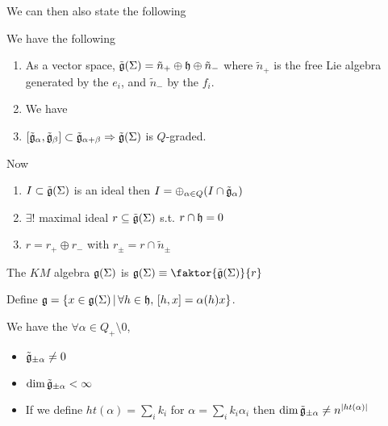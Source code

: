 \documentclass{article}
\begin{document}
We can then also state the following 

\begin{theorem}
We have the following 
\begin{enumerate}
    \item As a vector space, $\tilde{\mf{g}}(\Sigma) = \tilde{n}_+ \oplus \mf{h} \oplus \tilde{n}_-$ where $\tilde{n}_+ $ is the free Lie algebra generated by the $e_i$, and $\tilde{n}_-$ by the $f_i$. 
    \item We have 
\item $\comm[\tilde{\mf{g}}_\alpha]{\tilde{\mf{g}}_\beta}\subset \tilde{\mf{g}}_{\alpha +\beta} \Rightarrow \tilde{\mf{g}}(\Sigma)$ is $Q$-graded. 
\end{enumerate}
\end{theorem}

Now 
\begin{lemma}
\begin{enumerate}
    \item $I \subset \tilde{\mf{g}}(\Sigma)$ is an ideal then $I = \oplus_{\alpha \in Q} (I \cap \tilde{\mf{g}}_\alpha)$
    \item $\exists! $ maximal ideal $r \subseteq \tilde{\mf{g}}(\Sigma)$ s.t. $r \cap \mf{h}=0$ 
    \item $r = r_+ \oplus r_-$ with $r_\pm = r \cap \tilde{n}_\pm$
\end{enumerate}
\end{lemma}

\begin{definition}
The $KM$ algebra $\mf{g}(\Sigma)$ is $\mf{g}(\Sigma)\equiv \faktor{\tilde{\mf{g}}(\Sigma)}{r}$
\end{definition}

\begin{definition}
Define $\mf{g} = \pbrace{x \in \mf{g}(\Sigma) \, | \, \forall h \in \mf{h}, \, \comm[h]{x} = \alpha(h)x}$.
\end{definition}

\begin{remark}
We have the $\forall \alpha \in Q_+ \setminus 0$, 
\begin{itemize}
    \item $\tilde{\mf{g}}_{\pm\alpha} \neq 0$
    \item $\dim \tilde{\mf{g}}_{\pm\alpha}<\infty$
    \item If we define $ht(\alpha) = \sum_i k_i$ for $\alpha = \sum_i k_i \alpha_i$ then $\dim\tilde{\mf{g}}_{\pm\alpha} \neq n^{\abs{ht(\alpha)}}$
\end{itemize}
\end{remark}
\end{document}

